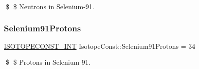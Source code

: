 \$ \$ Neutrons in Selenium-\/91. \mbox{\label{group___isotope_const-_selenium-_se91_ga7b61b1d472fbc415a7780bb1c7ccba07}} 
\subsubsection{\texorpdfstring{Selenium91\+Protons}{Selenium91Protons}}
{\footnotesize\ttfamily \mbox{\hyperlink{group___isotope_const-_macros_ga5f18360b3e99483a35c32d789e62621c}{I\+S\+O\+T\+O\+P\+E\+C\+O\+N\+S\+T\+\_\+\+I\+NT}} Isotope\+Const\+::\+Selenium91\+Protons = 34}

\$ \$ Protons in Selenium-\/91. 